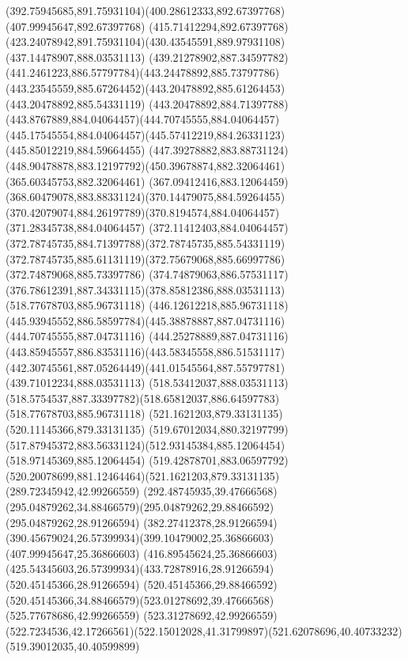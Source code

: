 {{	\curveto(392.75945685,891.75931104)(400.28612333,892.67397768)(407.99945647,892.67397768)
	\curveto(415.71412294,892.67397768)(423.24078942,891.75931104)(430.43545591,889.97931108)
	\moveto(437.14478907,888.03531113)
	\curveto(439.21278902,887.34597782)(441.2461223,886.57797784)(443.24478892,885.73797786)
	\curveto(443.23545559,885.67264452)(443.20478892,885.61264453)(443.20478892,885.54331119)
	\curveto(443.20478892,884.71397788)(443.8767889,884.04064457)(444.70745555,884.04064457)
	\curveto(445.17545554,884.04064457)(445.57412219,884.26331123)(445.85012219,884.59664455)
	\curveto(447.39278882,883.88731124)(448.90478878,883.12197792)(450.39678874,882.32064461)
	\lineto(365.60345753,882.32064461)
	\curveto(367.09412416,883.12064459)(368.60479078,883.88331124)(370.14479075,884.59264455)
	\curveto(370.42079074,884.26197789)(370.8194574,884.04064457)(371.28345738,884.04064457)
	\curveto(372.11412403,884.04064457)(372.78745735,884.71397788)(372.78745735,885.54331119)
	\curveto(372.78745735,885.61131119)(372.75679068,885.66997786)(372.74879068,885.73397786)
	\curveto(374.74879063,886.57531117)(376.78612391,887.34331115)(378.85812386,888.03531113)
	\closepath
	\moveto(518.77678703,885.96731118)
	\lineto(446.12612218,885.96731118)
	\curveto(445.93945552,886.58597784)(445.38878887,887.04731116)(444.70745555,887.04731116)
	\curveto(444.25278889,887.04731116)(443.85945557,886.83531116)(443.58345558,886.51531117)
	\curveto(442.30745561,887.05264449)(441.01545564,887.55797781)(439.71012234,888.03531113)
	\lineto(518.53412037,888.03531113)
	\curveto(518.5754537,887.33397782)(518.65812037,886.64597783)(518.77678703,885.96731118)
	\moveto(521.1621203,879.33131135)
	\lineto(520.11145366,879.33131135)
	\curveto(519.67012034,880.32197799)(517.87945372,883.56331124)(512.93145384,885.12064454)
	\lineto(518.97145369,885.12064454)
	\curveto(519.42878701,883.06597792)(520.20078699,881.12464464)(521.1621203,879.33131135)
	\moveto(289.72345942,42.99266559)
	\curveto(292.48745935,39.47666568)(295.04879262,34.88466579)(295.04879262,29.88466592)
	\lineto(295.04879262,28.91266594)
	\lineto(382.27412378,28.91266594)
	\curveto(390.45679024,26.57399934)(399.10479002,25.36866603)(407.99945647,25.36866603)
	\curveto(416.89545624,25.36866603)(425.54345603,26.57399934)(433.72878916,28.91266594)
	\lineto(520.45145366,28.91266594)
	\lineto(520.45145366,29.88466592)
	\curveto(520.45145366,34.88466579)(523.01278692,39.47666568)(525.77678686,42.99266559)
	\lineto(523.31278692,42.99266559)
	\curveto(522.7234536,42.17266561)(522.15012028,41.31799897)(521.62078696,40.40733232)
	\lineto(519.39012035,40.40599899)
}}
